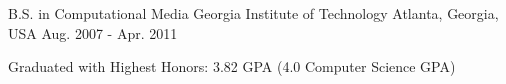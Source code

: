

\begin{cventries}

  \cventry
    {B.S. in Computational Media} %
    {Georgia Institute of Technology} %
    {Atlanta, Georgia, USA} %
    {Aug. 2007 - Apr. 2011} %
    {
      \begin{cvitems} %
        \item {Graduated with Highest Honors: 3.82 GPA (4.0 Computer Science GPA)}
      \end{cvitems}
    }

\end{cventries}
